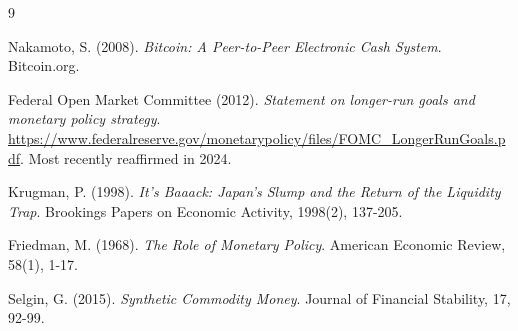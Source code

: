 \documentclass[11pt]{article}
\begin{document}
\begin{thebibliography}{9}

Nakamoto, S. (2008).
\textit{Bitcoin: A Peer-to-Peer Electronic Cash System}.
Bitcoin.org.

Federal Open Market Committee (2012).
\textit{Statement on longer-run goals and monetary policy strategy}.
\url{https://www.federalreserve.gov/monetarypolicy/files/FOMC_LongerRunGoals.pdf}.
Most recently reaffirmed in 2024.

Krugman, P. (1998).
\textit{It's Baaack: Japan's Slump and the Return of the Liquidity Trap}.
Brookings Papers on Economic Activity, 1998(2), 137-205.

Friedman, M. (1968).
\textit{The Role of Monetary Policy}.
American Economic Review, 58(1), 1-17.

Selgin, G. (2015).
\textit{Synthetic Commodity Money}.
Journal of Financial Stability, 17, 92-99.

\end{thebibliography}
\end{document}
